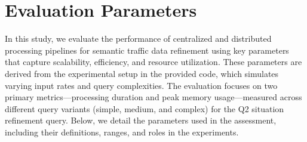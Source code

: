\documentclass[5p,times]{elsarticle}
\begin{document}
\section{Evaluation Parameters}
In this study, we evaluate the performance 
of centralized and distributed processing pipelines for semantic traffic data refinement using key parameters that capture scalability, efficiency, and resource utilization. These parameters are derived from the experimental setup in the provided code, which simulates varying input rates and query complexities. The evaluation focuses on two primary metrics—processing duration and peak memory usage—measured across different query variants (simple, medium, and complex) for the Q2 situation refinement query. Below, we detail the parameters used in the assessment,
 including their definitions, ranges, and roles in the experiments.
\end{document}
